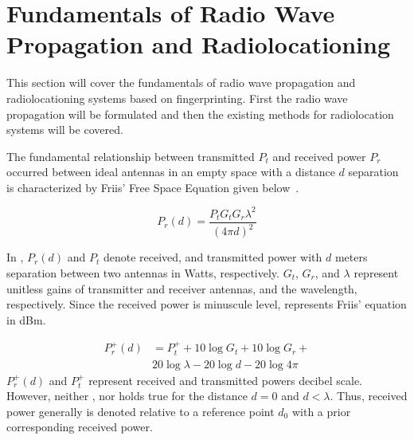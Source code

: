 \section{\label{sec-FU}Fundamentals of Radio Wave Propagation and Radiolocationing}
    This section will cover the fundamentals of radio wave propagation and radiolocationing systems based on fingerprinting.
    First the radio wave propagation will be formulated and then the existing methods for radiolocation systems will be covered.

    The fundamental relationship between transmitted $P_t$ and received power $P_r$ occurred between ideal antennas in an empty space with a distance $d$ separation is characterized by Friis' Free Space Equation given below~\cite{friis1946note}.

    \begin{equation}
        \label{eq:friisWatts}
            P_r(d) = \dfrac{P_t  G_t  G_r \lambda^2}{{\left(4 \pi d\right)}^2}
    \end{equation}

    In , $P_r(d)$ and $P_t$ denote received, and transmitted power with $d$ meters separation between two antennas in Watts, respectively.
    $G_t$, $G_r$, and $\lambda$ represent unitless gains of transmitter and receiver antennas, and the wavelength, respectively.
    Since the received power is minuscule level,  represents Friis' equation in dBm.

    \begin{equation}
      \begin{split}
        \label{eq:friisdBm}
        P^{+}_r(d) &= P^{+}_t + 10 \log{G_t} + 10 \log{G_r} + \\
        & 20 \log{\lambda} - 20 \log{d} - 20 \log{4 \pi}
      \end{split}
    \end{equation}
    $P^{+}_r(d)$ and $P^{+}_t$ represent received and transmitted powers decibel scale.
    However, neither , nor  holds true for the distance $d = 0$ and $d<\lambda$.
    Thus, received power generally is denoted relative to a reference point $d_0$ with a prior corresponding received power.

